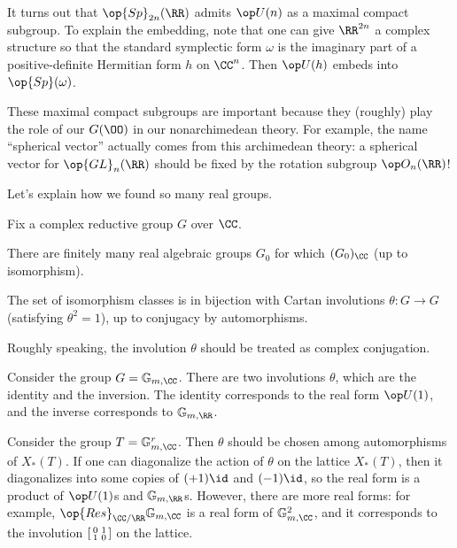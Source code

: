 \documentclass[../notes.tex]{subfiles}
\begin{document}
\begin{example}
	It turns out that $\op{Sp}_{2n}(\RR)$ admits $\op U(n)$ as a maximal compact subgroup. To explain the embedding, note that one can give $\RR^{2n}$ a complex structure so that the standard symplectic form $\omega$ is the imaginary part of a positive-definite Hermitian form $h$ on $\CC^n$. Then $\op U(h)$ embeds into $\op{Sp}(\omega)$.
\end{example}
\begin{remark}
	These maximal compact subgroups are important because they (roughly) play the role of our $G(\OO)$ in our nonarchimedean theory. For example, the name ``spherical vector'' actually comes from this archimedean theory: a spherical vector for $\op{GL}_n(\RR)$ should be fixed by the rotation subgroup $\op O_n(\RR)$!
\end{remark}
Let's explain how we found so many real groups.
\begin{theorem}[Cartan]
	Fix a complex reductive group $G$ over $\CC$.
	\begin{listalph}
		\item There are finitely many real algebraic groups $G_0$ for which $(G_0)_\CC$ (up to isomorphism).
		\item The set of isomorphism classes is in bijection with Cartan involutions $\theta\colon G\to G$ (satisfying $\theta^2=1$), up to conjugacy by automorphisms.
	\end{listalph}
\end{theorem}
Roughly speaking, the involution $\theta$ should be treated as complex conjugation.
\begin{example}
	Consider the group $G=\mathbb G_{m,\CC}$. There are two involutions $\theta$, which are the identity and the inversion. The identity corresponds to the real form $\op U(1)$, and the inverse corresponds to $\mathbb G_{m,\RR}$.
\end{example}
\begin{example}
	Consider the group $T=\mathbb G_{m,\CC}^r$. Then $\theta$ should be chosen among automorphisms of $X_*(T)$. If one can diagonalize the action of $\theta$ on the lattice $X_*(T)$, then it diagonalizes into some copies of $(+1)\id$ and $(-1)\id$, so the real form is a product of $\op U(1)$s and $\mathbb G_{m,\RR}$s. However, there are more real forms: for example, $\op{Res}_{\CC/\RR}\mathbb G_{m,\CC}$ is a real form of $\mathbb G_{m,\CC}^2$, and it corresponds to the involution $\begin{bsmallmatrix}
		0 & 1 \\ 1 & 0
	\end{bsmallmatrix}$ on the lattice.
\end{example}
\end{document}

